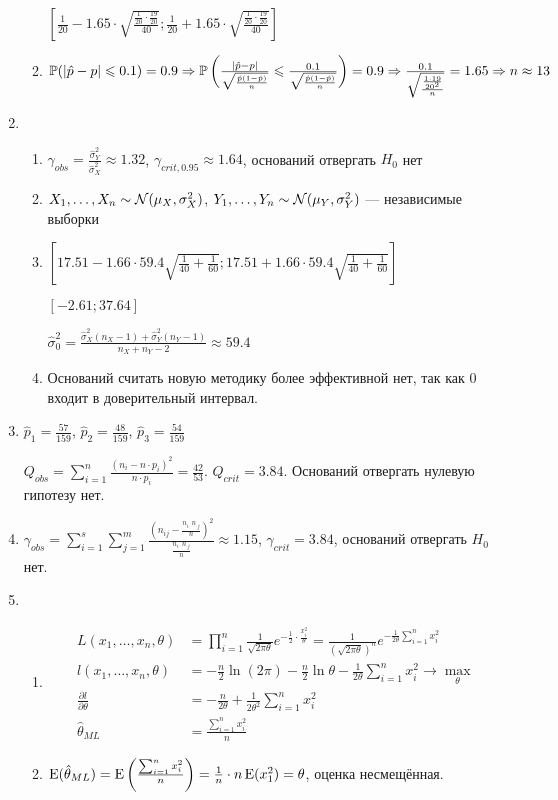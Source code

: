 \begin{enumerate}
\begin{enumerate}
$\left[\frac{1}{20} - 1.65 \cdot \sqrt{\frac{\frac{1}{20}\cdot\frac{19}{20}}{40}}; \frac{1}{20} + 1.65 \cdot \sqrt{\frac{\frac{1}{20}\cdot\frac{19}{20}}{40}}  \right]$
\item $\P(\vert \hat{p} - p \vert \leq 0.1) = 0.9 \Rightarrow \P\left(\frac{\vert \hat{p} - p \vert}{\sqrt{\frac{\hat{p}(1-\hat{p})}{n}}} \leq \frac{0.1}{\sqrt{\frac{\hat{p}(1-\hat{p})}{n}}} \right) = 0.9 \Rightarrow \frac{0.1}{\sqrt{\frac{\frac{1\cdot19}{20^2}}{n}}} = 1.65 \Rightarrow n \approx 13$
\end{enumerate}
\item
\begin{enumerate}
\item $\gamma_{obs} = \frac{\hat{\sigma}^2_Y}{\hat{\sigma}^2_X} \approx 1.32$, $\gamma_{crit, 0.95} \approx 1.64$,
оснований отвергать $H_0$ нет
\item $X_1, \ldots, X_n \sim \cN(\mu_X, \sigma^2_X)$, $Y_1, \ldots, Y_n \sim \cN(\mu_Y, \sigma^2_Y)$ — независимые выборки
\item $\left[17.51 - 1.66 \cdot 59.4 \sqrt{\frac{1}{40}+ \frac{1}{60}}; 17.51 + 1.66 \cdot 59.4 \sqrt{\frac{1}{40}+ \frac{1}{60}} \right]$

$[-2.61; 37.64]$

$\hat{\sigma}_0^2 = \frac{\hat{\sigma}^2_X(n_X-1) + \hat{\sigma}^2_Y(n_Y-1)}{n_X+n_Y-2} \approx 59.4$
\item Оснований считать новую методику более эффективной нет, так как $0$ входит в доверительный интервал.
\end{enumerate}
\item $\hat{p}_1 = \frac{57}{159}$, $\hat{p}_2 = \frac{48}{159}$, $\hat{p}_3 = \frac{54}{159}$

$Q_{obs} = \sum_{i=1}^n \frac{(n_i - n \cdot p_i)^2}{n \cdot p_i} = \frac{42}{53}$. $Q_{crit} = 3.84$.
Оснований отвергать нулевую гипотезу нет.
\item $\gamma_{obs} = \sum_{i=1}^s \sum_{j=1}^m \frac{\left(n_{ij} - \frac{n_{i\cdot}n_{\cdot j}}{n}\right)^2}{\frac{n_{i\cdot}n_{\cdot j}}{n}} \approx 1.15$,
$\gamma_{crit} = 3.84$, оснований отвергать $H_0$ нет.
\item
\begin{enumerate}
\item \begin{align*}
L(x_1, \ldots, x_n, \theta) &= \prod_{i=1}^n \frac{1}{\sqrt{2\pi\theta}}e^{-\frac{1}{2}\cdot\frac{x_i^2}{\theta}} = \frac{1}{(\sqrt{2\pi\theta})^n} e^{-\frac{1}{2\theta} \sum_{i=1}^n x_i^2} \\
l(x_1, \ldots, x_n, \theta) &= -\frac{n}{2} \ln (2\pi) - \frac{n}{2} \ln \theta -\frac{1}{2\theta} \sum_{i=1}^n x_i^2 \to \max_{\theta} \\
\frac{\partial l}{\partial \theta} &= - \frac{n}{2 \theta} + \frac{1}{2\theta^2} \sum_{i=1}^n x_i^2 \\
\hat{\theta}_{ML} &= \frac{\sum_{i=1}^n x_i^2}{n}
\end{align*}
\item $\E(\hat{\theta}_{ML}) = \E\left(\frac{\sum_{i=1}^n x_i^2}{n}\right) = \frac{1}{n}\cdot n \E(x_1^2) = \theta$,
оценка несмещённая.


\end{enumerate}
\end{enumerate}
